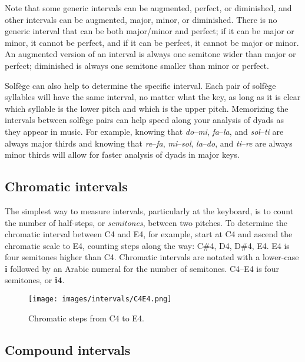 \documentclass{book}
\begin{document}
Note that some generic intervals can be augmented, perfect, or diminished, and
other intervals can be augmented, major, minor, or diminished. There is no
generic interval that can be both major/minor and perfect; if it can be major
or minor, it cannot be perfect, and if it can be perfect, it cannot be major
or minor. An augmented version of an interval is always one semitone wider
than major or perfect; diminished is always one semitone smaller than minor or
perfect.

Solfège can also help to determine the specific interval. Each pair of solfège
syllables will have the same interval, no matter what the key, as long as it
is clear which syllable is the lower pitch and which is the upper pitch.
Memorizing the intervals between solfège pairs can help speed along your
analysis of dyads as they appear in music. For example, knowing that
\emph{do}--\emph{mi}, \emph{fa}--\emph{la}, and \emph{sol}--\emph{ti} are
always major thirds and knowing that \emph{re}--\emph{fa},
\emph{mi}--\emph{sol}, \emph{la}--\emph{do}, and \emph{ti}--\emph{re} are
always minor thirds will allow for faster analysis of dyads in major keys.

\hypertarget{chromatic-intervals}{%
\subsection{Chromatic intervals}\label{chromatic-intervals}}

The simplest way to measure intervals, particularly at the keyboard, is to
count the number of half-steps, or \emph{semitones}, between two pitches. To
determine the chromatic interval between C4 and E4, for example, start at C4
and ascend the chromatic scale to E4, counting steps along the way: C\#4, D4,
D\#4, E4. E4 is four semitones higher than C4. Chromatic intervals are notated
with a lower-case \textbf{i} followed by an Arabic numeral for the number of
semitones. C4--E4 is four semitones, or \textbf{i4}.

\begin{figure}
\centering
\texttt{[image: images/intervals/C4E4.png]}
\caption{Chromatic steps from C4 to E4.}
\end{figure}

\hypertarget{compound-intervals}{%
\subsection{Compound intervals}\label{compound-intervals}}
\end{document}
